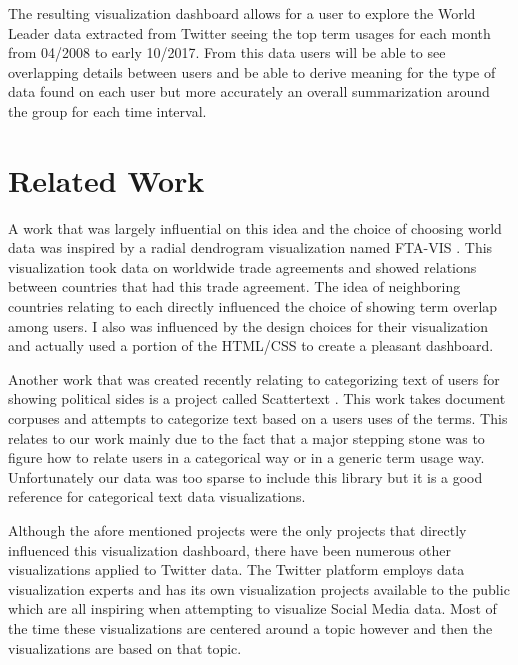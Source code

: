 \documentclass[journal]{vgtc}                %
\begin{document}
The resulting visualization dashboard allows for a user to explore the World Leader data extracted from Twitter seeing the top term usages for each month from 04/2008 to early 10/2017.
From this data users will be able to see overlapping details between users and be able to derive meaning for the type of data found on each user but more accurately an overall summarization around the group for each time interval.

\section{Related Work}

A work that was largely influential on this idea and the choice of choosing world data was inspired by a radial dendrogram visualization named FTA-VIS \cite{fta-vis}.
This visualization took data on worldwide trade agreements and showed relations between countries that had this trade agreement.
The idea of neighboring countries relating to each directly influenced the choice of showing term overlap among users.
I also was influenced by the design choices for their visualization and actually used a portion of the HTML/CSS to create a pleasant dashboard.

Another work that was created recently relating to categorizing text of users for showing political sides is a project called Scattertext \cite{kessler2017scattertext}.
This work takes document corpuses and attempts to categorize text based on a users uses of the terms.
This relates to our work mainly due to the fact that a major stepping stone was to figure how to relate users in a categorical way or in a generic term usage way.
Unfortunately our data was too sparse to include this library but it is a good reference for categorical text data visualizations.

Although the afore mentioned projects were the only projects that directly influenced this visualization dashboard, there have been numerous other visualizations applied to Twitter data.
The Twitter platform employs data visualization experts and has its own visualization projects available to the public which are all inspiring when attempting to visualize Social Media data.
Most of the time these visualizations are centered around a topic however and then the visualizations are based on that topic.
\end{document}
